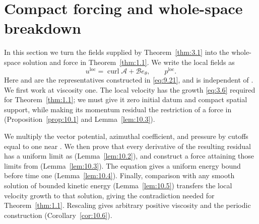 \section{Compact forcing and whole-space breakdown}\label{sec:10}

In this section we turn the fields supplied by Theorem~\ref{thm:3.1} into the whole-space solution
and force in Theorem~\ref{thm:1.1}. We write the local fields as
\[
u^{\mathrm{loc}}=\operatorname{curl}\mathcal A+\mathcal Be_\theta,
\qquad p^{\mathrm{loc}}.
\]
Here  and  are the representatives
constructed in \eqref{eq:9.21}, and  is independent of
. We first work at viscosity one. The local velocity has the growth
\eqref{eq:3.6} required for Theorem~\ref{thm:1.1};
%
we must give it zero initial datum and compact spatial support, while making its momentum residual
the restriction of a force in
(Proposition~\ref{prop:10.1} and Lemma~\ref{lem:10.3}).

We multiply the vector potential, azimuthal coefficient, and pressure by cutoffs equal to one near
. We then prove that every derivative of the resulting residual has a
uniform limit as  (Lemma~\ref{lem:10.2}), and construct a force
attaining those limits from  (Lemma~\ref{lem:10.3}). The equation gives
a uniform energy bound before time one (Lemma~\ref{lem:10.4}). Finally, comparison with any smooth
solution of bounded kinetic energy (Lemma~\ref{lem:10.5}) transfers the local velocity growth to that
solution, giving the contradiction needed for Theorem~\ref{thm:1.1}. Rescaling gives arbitrary
positive viscosity and the periodic construction (Corollary~\ref{cor:10.6}).

